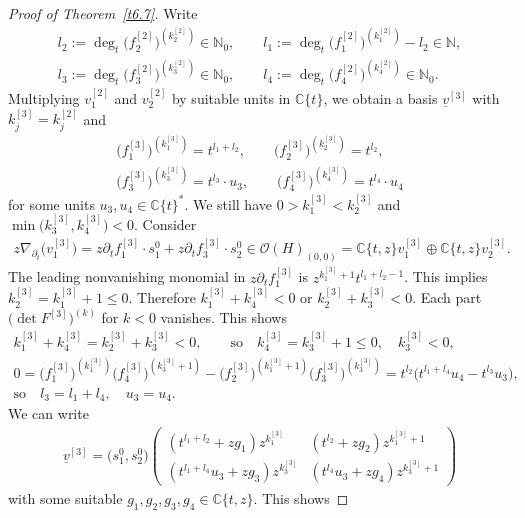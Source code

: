 \documentclass[10pt,a4paper]{amsart}
\numberwithin{equation}{section}
\numberwithin{figure}{section}
\newcommand{\N}{{\mathbb N}}
\newcommand{\C}{{\mathbb C}}
\newcommand{\OO}{{\mathcal O}}
\newcommand{\uuuu}{\underline}
\newcommand{\paa}{\partial}
\newcommand{\nnn}{\nabla}
\begin{document}
\begin{proof}[Proof of Theorem~\ref{t6.7}]
Write
\begin{gather*}
l_2:=\deg_t\big(f_2^{[2]}\big)^{(k_2^{[2]})}\in\N_0,\qquad
l_1:=\deg_t \big(f_1^{[2]}\big)^{(k_1^{[2]})}-l_2\in\N,
\\
l_3:=\deg_t\big(f_3^{[2]}\big)^{(k_3^{[2]})}\in\N_0,\qquad
l_4:=\deg_t \big(f_4^{[2]}\big)^{(k_4^{[2]})}\in\N_0.
\end{gather*}
Multiplying $v_1^{[2]}$ and $v_2^{[2]}$ by suitable units in
$\C\{t\}$, we obtain a basis $\uuuu{v}^{[3]}$ with
$k_j^{[3]}=k_j^{[2]}$ and
\begin{gather*}
\big(f_1^{[3]}\big)^{(k_1^{[3]})}=t^{l_1+l_2},\qquad
\big(f_2^{[3]}\big)^{(k_2^{[3]})}=t^{l_2},
\\
\big(f_3^{[3]}\big)^{(k_3^{[3]})}=t^{l_3}\cdot u_3,\qquad
\big(f_4^{[3]}\big)^{(k_4^{[3]})}=t^{l_4}\cdot u_4
\end{gather*}
for some units $u_3,u_4\in\C\{t\}^*$.
We still have $0>k_1^{[3]}<k_2^{[3]}$ and
$\min\big(k_3^{[3]},k_4^{[3]}\big)<0$. Consider
\begin{gather*}
z\nnn_{\paa_t}\big(v_1^{[3]}\big)=z\paa_t f_1^{[3]}\cdot s_1^0 +
z\paa_t f_3^{[3]}\cdot s_2^0 \in \OO(H)_{(0,0)}
=\C\{t,z\}v_1^{[3]} \oplus \C\{t,z\}v_2^{[3]}.
\end{gather*}
The leading nonvanishing monomial in $z\paa_t f_1^{[3]}$
is $z^{k_1^{[3]}+1}t^{l_1+l_2-1}$.
This implies $k_2^{[3]}=k_1^{[3]}+1\leq 0$.
Therefore $k_1^{[3]}+k_4^{[3]}<0$ or
$k_2^{[3]}+k_3^{[3]}<0$. Each part
$\big(\det F^{[3]}\big)^{(k)}$ for $k<0$ vanishes. This shows
\begin{gather*}
k_1^{[3]}+k_4^{[3]}=k_2^{[3]}+k_3^{[3]}<0, \qquad \text{so}\quad
k_4^{[3]}=k_3^{[3]}+1\leq 0,\quad k_3^{[3]}<0,
\\
0=\big(f_1^{[3]}\big)^{(k_1^{[3]})} \big(f_4^{[3]}\big)^{(k_3^{[3]}+1)}
-\big(f_2^{[3]}\big)^{(k_1^{[3]}+1)} \big(f_3^{[3]}\big)^{(k_3^{[3]})}
= t^{l_2}\bigl(t^{l_1+l_4}u_4 - t^{l_3}u_3\bigr),
\\
\text{so}\quad l_3=l_1+l_4, \quad u_3=u_4.
\end{gather*}
We can write
\begin{gather*}
\uuuu{v}^{[3]}= \big(s_1^0,s_2^0\big)\begin{pmatrix}
(t^{l_1+l_2}+zg_1)z^{k_1^{[3]}} & (t^{l_2}+zg_2)z^{k_1^{[3]}+1} \\
(t^{l_1+l_4}u_3 + zg_3)z^{k_3^{[3]}} & (t^{l_4}u_3 + zg_4)z^{k_3^{[3]}+1}
\end{pmatrix}
\end{gather*}
with some suitable $g_1,g_2,g_3,g_4\in\C\{t,z\}$.
This shows

\end{proof}
\end{document}
